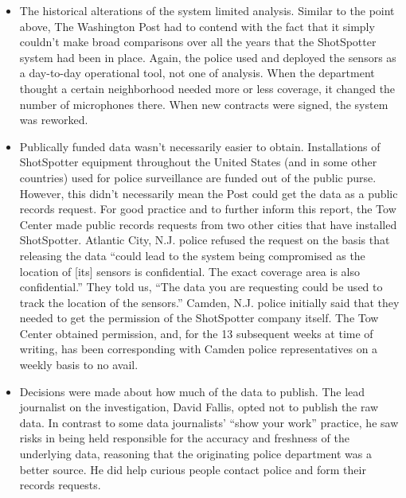 \begin{itemize}
\item The historical alterations of the system limited analysis.
Similar to the point above, The Washington Post had to contend with
the fact that it simply couldn't make broad comparisons over all the
years that the ShotSpotter system had been in place. Again, the police
used and deployed the sensors as a day-to-day operational tool, not
one of analysis. When the department thought a certain neighborhood
needed more or less coverage, it changed the number of microphones
there. When new contracts were signed, the system was reworked.
\item Publically funded data wasn't necessarily easier to obtain.
Installations of ShotSpotter equipment throughout the United States
(and in some other countries) used for police surveillance are funded
out of the public purse. However, this didn't necessarily mean the Post
could get the data as a public records request. For good practice and
to further inform this report, the Tow Center made public records
requests from two other cities that have installed ShotSpotter. Atlantic
City, N.J. police refused the request on the basis that releasing the
data ``could lead to the system being compromised as the location of
[its] sensors is confidential. The exact coverage area is also confidential.''
They told us, ``The data you are requesting could be used to track
the location of the sensors.'' Camden, N.J. police initially said that they
needed to get the permission of the ShotSpotter company itself. The
Tow Center obtained permission, and, for the 13 subsequent weeks at
time of writing, has been corresponding with Camden police representatives
on a weekly basis to no avail.
\item Decisions were made about how much of the data to publish.
The lead journalist on the investigation, David Fallis, opted not to
publish the raw data. In contrast to some data journalists' ``show your
work'' practice, he saw risks in being held responsible for the accuracy
and freshness of the underlying data, reasoning that the originating
police department was a better source. He did help curious people
contact police and form their records requests.
\end{itemize}

